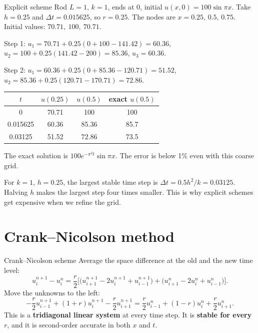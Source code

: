\begin{examplebox}{Explicit scheme}
Rod $L=1$, $k=1$, ends at $0$, initial $u(x,0) = 100\sin\pi x$. Take $h=0.25$ and $\Delta t = 0.015625$, so $r = 0.25$. The nodes are $x=0.25,\,0.5,\,0.75$. Initial values: $70.71,\ 100,\ 70.71$.

Step 1: $u_1 = 70.71 + 0.25(0 + 100 - 141.42) = 60.36$, \quad $u_2 = 100 + 0.25(141.42 - 200) = 85.36$, \quad $u_3=60.36$.

Step 2: $u_1 = 60.36 + 0.25(0 + 85.36 - 120.71) = 51.52$, \quad $u_2 = 85.36 + 0.25(120.71 - 170.71) = 72.86$.

\begin{center}
\begin{tabular}{@{}cccc@{}}
\toprule
$t$ & $u(0.25)$ & $u(0.5)$ & exact $u(0.5)$ \\
\midrule
0 & 70.71 & 100 & 100 \\
0.015625 & 60.36 & 85.36 & 85.7 \\
0.03125 & 51.52 & 72.86 & 73.5 \\
\bottomrule
\end{tabular}
\end{center}
The exact solution is $100e^{-\pi^2t}\sin\pi x$. The error is below 1\% even with this coarse grid.
\end{examplebox}

\begin{notebox}
For $k=1$, $h=0.25$, the largest stable time step is $\Delta t = 0.5h^2/k = 0.03125$. Halving $h$ makes the largest step four times smaller. This is why explicit schemes get expensive when we refine the grid.
\end{notebox}

\section{Crank--Nicolson method}

\begin{methodbox}{Crank--Nicolson scheme}
Average the space difference at the old and the new time level:
\[ u_i^{n+1} - u_i^n = \frac r2\Big[\big(u_{i+1}^{n+1} - 2u_i^{n+1} + u_{i-1}^{n+1}\big) + \big(u_{i+1}^{n} - 2u_i^{n} + u_{i-1}^{n}\big)\Big]. \]
Move the unknowns to the left:
\[ -\frac r2u_{i-1}^{n+1} + (1+r)u_i^{n+1} - \frac r2u_{i+1}^{n+1} = \frac r2u_{i-1}^n + (1-r)u_i^n + \frac r2u_{i+1}^n. \]
This is a \textbf{tridiagonal linear system} at every time step. It is \textbf{stable for every $r$}, and it is second-order accurate in both $x$ and $t$.
\end{methodbox}

